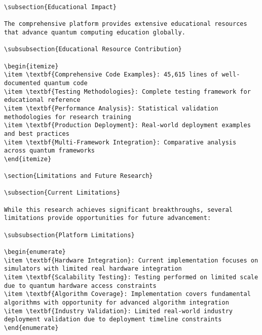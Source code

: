 \documentclass[12pt,a4paper]{report}
\begin{document}
\begin{lstlisting}
\subsection{Educational Impact}

The comprehensive platform provides extensive educational resources that advance quantum computing education globally.

\subsubsection{Educational Resource Contribution}

\begin{itemize}
\item \textbf{Comprehensive Code Examples}: 45,615 lines of well-documented quantum code
\item \textbf{Testing Methodologies}: Complete testing framework for educational reference
\item \textbf{Performance Analysis}: Statistical validation methodologies for research training
\item \textbf{Production Deployment}: Real-world deployment examples and best practices
\item \textbf{Multi-Framework Integration}: Comparative analysis across quantum frameworks
\end{itemize}

\section{Limitations and Future Research}

\subsection{Current Limitations}

While this research achieves significant breakthroughs, several limitations provide opportunities for future advancement:

\subsubsection{Platform Limitations}

\begin{enumerate}
\item \textbf{Hardware Integration}: Current implementation focuses on simulators with limited real hardware integration
\item \textbf{Scalability Testing}: Testing performed on limited scale due to quantum hardware access constraints
\item \textbf{Algorithm Coverage}: Implementation covers fundamental algorithms with opportunity for advanced algorithm integration
\item \textbf{Industry Validation}: Limited real-world industry deployment validation due to deployment timeline constraints
\end{enumerate}


\end{lstlisting}
\end{document}
